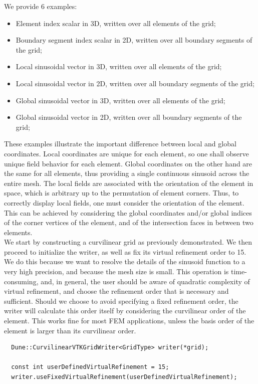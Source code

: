 \noindent
We provide 6 examples:
\begin{itemize}
  \item Element index scalar in 3D, written over all elements of the grid;
  \item Boundary segment index scalar in 2D, written over all boundary segments of the grid;
  \item Local sinusoidal vector in 3D, written over all elements of the grid;
  \item Local sinusoidal vector in 2D, written over all boundary segments of the grid;
  \item Global sinusoidal vector in 3D, written over all elements of the grid;
  \item Global sinusoidal vector in 2D, written over all boundary segments of the grid;
\end{itemize}

\noindent
These examples illustrate the important difference between local and global coordinates. Local coordinates are unique for each element, so one shall observe unique field behavior for each element. Global coordinates on the other hand are the same for all elements, thus providing a single continuous sinusoid across the entire mesh. The local fields are associated with the orientation of the element in space, which is arbitrary up to the permutation of element corners. Thus, to correctly display local fields, one must consider the orientation of the element. This can be achieved by considering the global coordinates and/or global indices of the corner vertices of the element, and of the intersection faces in between two elements. \\

\noindent
We start by constructing a curvilinear grid as previously demonstrated. We then proceed to initialize the writer, as well as fix its virtual refinement order to 15. We do this because we want to resolve the details of the sinusoid function to a very high precision, and because the mesh size is small. This operation is time-consuming, and, in general, the user should be aware of quadratic complexity of virtual refinement, and choose the refinement order that is necessary and sufficient. Should we choose to avoid specifying a fixed refinement order, the writer will calculate this order itself by considering the curvilinear order of the element. This works fine for most FEM applications, unless the basis order of the element is larger than its curvilinear order.

\begin{mybox}
\begin{lstlisting}    
  Dune::CurvilinearVTKGridWriter<GridType> writer(*grid);
    
  const int userDefinedVirtualRefinement = 15;
  writer.useFixedVirtualRefinement(userDefinedVirtualRefinement);
\end{lstlisting}
\end{mybox}

